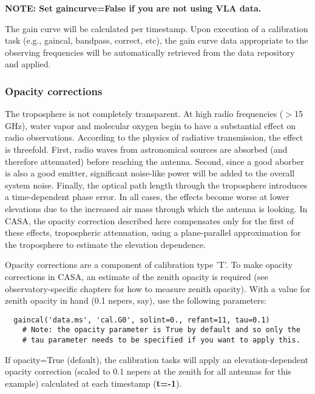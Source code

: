 {\bf NOTE: Set gaincurve=False if you are not using VLA data.}

The gain curve will be calculated per timestamp.  Upon execution of a
calibration task (e.g., gaincal, bandpass, correct, etc), the gain
curve data appropriate to the observing frequencies will be
automatically retrieved from the data repository and applied.

\subsubsection{Opacity corrections}
\label{subsubsection:a.priori.opacity}

The troposphere is not completely transparent.  At high radio
frequencies ($>$15 GHz), water vapor and molecular oxygen begin to
have a substantial effect on radio observations. According to the
physics of radiative transmission, the effect is threefold.  First,
radio waves from astronomical sources are absorbed (and therefore
attenuated) before reaching the antenna.  Second, since a good aborber
is also a good emitter, significant noise-like power will be added to
the overall system noise.  Finally, the optical path length through
the troposphere introduces a time-dependent phase error.  In all
cases, the effects become worse at lower elevations due to the
increased air mass through which the antenna is looking.  In CASA,
the opacity correction described here compensates only for the first
of these effects, tropospheric attenuation, using a plane-parallel
approximation for the troposphere to estimate the elevation
dependence.

Opacity corrections are a component of calibration type 'T'.  To make
opacity corrections in CASA, an estimate of the zenith opacity is
required (see observatory-specific chapters for how to measure zenith
opacity).  With a value for zenith opacity in hand (0.1 nepers, say),
use the following parameters:

\small
\begin{verbatim}
  gaincal('data.ms', 'cal.G0', solint=0., refant=11, tau=0.1)
    # Note: the opacity parameter is True by default and so only the 
    # tau parameter needs to be specified if you want to apply this.
\end{verbatim}
\normalsize

If opacity=True (default), the calibration tasks will apply an
elevation-dependent opacity correction (scaled to 0.1 nepers at the
zenith for all antennas for this example) calculated at each timestamp
({\bf t=-1}).

